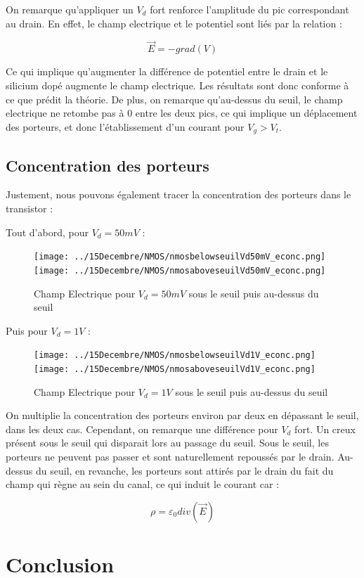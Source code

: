 \documentclass[a4paper,11pt]{report}
\begin{document}
On remarque qu'appliquer un $V_d$ fort renforce l'amplitude du pic correspondant au drain. En effet, le champ electrique et le potentiel sont liés par la relation :

\[\vec{E}=-grad(V)\]

Ce qui implique qu'augmenter la différence de potentiel entre le drain et le silicium dopé augmente le champ electrique. Les résultats sont donc conforme à ce que prédit la théorie. De plus, on remarque qu'au-dessus du seuil, le champ electrique ne retombe pas à 0 entre les deux pics, ce qui implique un déplacement des porteurs, et donc l'établissement d'un courant pour $V_g>V_t$.
\vspace{0.5cm}

\section{Concentration des porteurs}

Justement, nous pouvons également tracer la concentration des porteurs dans le transistor :

Tout d'abord, pour $V_d=50mV$ :
\begin{figure}[H]
\centering
\texttt{[image: ../15Decembre/NMOS/nmosbelowseuilVd50mV\_econc.png]} 
\texttt{[image: ../15Decembre/NMOS/nmosaboveseuilVd50mV\_econc.png]}
\caption{Champ Electrique pour $V_d=50mV$ sous le seuil puis au-dessus du seuil}
\end{figure}

Puis pour $V_d=1V$ :

\begin{figure}[H]
\centering
\texttt{[image: ../15Decembre/NMOS/nmosbelowseuilVd1V\_econc.png]} 
\texttt{[image: ../15Decembre/NMOS/nmosaboveseuilVd1V\_econc.png]}
\caption{Champ Electrique pour $V_d=1V$ sous le seuil puis au-dessus du seuil}
\end{figure}

On multiplie la concentration des porteurs environ par deux en dépassant le seuil, dans les deux cas. Cependant, on remarque une différence pour $V_d$ fort. Un creux présent sous le seuil qui disparait lors au passage du seuil. Sous le seuil, les porteurs ne peuvent pas passer et sont naturellement repoussés par le drain. Au-dessus du seuil, en revanche, les porteurs sont attirés par le drain du fait du champ qui règne au sein du canal, ce qui induit le courant car :

\[\rho=\varepsilon_0div(\vec{E})\]


\chapter*{Conclusion}
\end{document}
